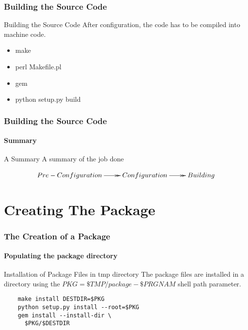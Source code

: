 \documentclass[12pt,hyperref={pdfpagelabels=true}]{beamer}
\begin{document}
\begin{frame}
  \frametitle{Building the Source Code}
  \begin{block}{Building the Source Code}
    After configuration, the code has to be compiled into machine code.
  \end{block}
  
  \pause
  
  \begin{example}
    \begin{itemize}[<+-| alert@+>]
    \item make
    \item perl Makefile.pl
    \item gem
    \item python setup.py build
    \end{itemize}
  \end{example}
\end{frame}

\begin{frame}
  \frametitle{Building the Source Code}
  \framesubtitle{Summary}
  \begin{block}{A Summary}
    A summary of the job done
  \end{block}
  \begin{equation*}
    \xymatrix@C=2pc@R=2pc{
      Pre-Configuration\ar@{->>}[r] & Configuration\ar@{->>}[r] & Building}
  \end{equation*}
\end{frame}

\section{Creating The Package}

\begin{frame}[fragile]
  \frametitle{The Creation of a Package}
  \framesubtitle{Populating the package directory}
  \begin{block}{Installation of Package Files in tmp directory}
    The package files are installed in a directory using the
    $PKG=\$TMP/package-\$PRGNAM$ shell path parameter.
  \end{block}
  
  \pause
  
  \begin{lstlisting}
    make install DESTDIR=$PKG
    python setup.py install --root=$PKG
    gem install --install-dir \
      $PKG/$DESTDIR
  \end{lstlisting}
  
  
\end{frame}
\end{document}
